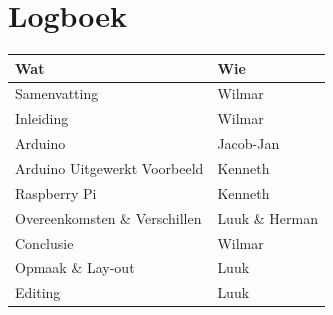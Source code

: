 \documentclass[a4paper, dutch, abstract=true]{scrartcl}
\begin{document}
\printbibliography

\section{Logboek}
\begin{tabular}{ll}
    \textbf{Wat}                  & \textbf{Wie}   \\
    \hline
    Samenvatting                  & Wilmar         \\
    Inleiding                     & Wilmar         \\
    Arduino                       & Jacob-Jan      \\
    Arduino Uitgewerkt Voorbeeld  & Kenneth        \\
    Raspberry Pi                  & Kenneth        \\
    Overeenkomsten \& Verschillen & Luuk \& Herman \\
    Conclusie                     & Wilmar         \\
    \hline
    Opmaak \& Lay-out             & Luuk           \\
    Editing                       & Luuk
\end{tabular}
\end{document}
